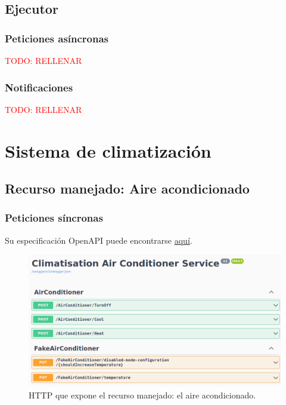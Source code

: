 \subsection{Ejecutor}

\subsubsection{Peticiones asíncronas}

\textcolor{red}{TODO: RELLENAR}

\subsubsection{Notificaciones}

\textcolor{red}{TODO: RELLENAR}

\section{Sistema de climatización}

\subsection{Recurso manejado: Aire acondicionado}

\subsubsection{Peticiones síncronas}

Su especificación OpenAPI puede encontrarse \href{https://github.com/Starkie/TFM-DistributedAutoadaptiveSystems/blob/1db95346290cb55edbfd5efb717785bcd06def79/src/AutoAdaptativeSystem/Climatisation/AirConditioner/Service/Climatisation.AirConditioner.Service-OpenAPISpec.json}{aquí}.

\begin{figure}[h!]
  \hspace{-0.25cm}
  \includegraphics[scale=0.45]{anx_apis/images/apis-airconditioner}
  \caption{ HTTP que expone el recurso manejado: el aire acondicionado.}
\end{figure}

